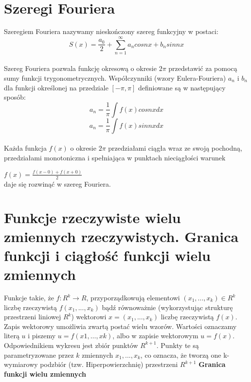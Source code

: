 \documentclass[10pt]{article}
\begin{document}
\section{Szeregi Fouriera}
    Szeregiem Fouriera nazywamy nieskończony szereg funkcyjny w postaci: 
    $$S(x)=\frac{a_0}{2}+\sum_{n=1}^{\infty}a_ncosnx + b_nsinnx$$ \\
    Szereg Fouriera pozwala funkcję okresową o okresie $2\pi$  przedstawić za pomocą sumy funkcji trygonometrycznych. 
    Współczynniki (wzory Eulera-Fouriera) $a_n$ i $b_n$ dla funkcji określonej na przedziale $[-\pi,\pi]$  definiowane są w następujący sposób:
    $$a_n=\frac{1}{\pi}\int f(x)cosnxdx $$
    $$a_n=\frac{1}{\pi}\int f(x)sinnxdx $$ \\
    Każda funkcja $f(x)$ o okresie $2\pi$ przedziałami ciągła wraz ze swoją pochodną, przedziałami monotoniczna i spełniająca w punktach nieciągłości warunek \par
    $f(x)=\frac{f(x-0)+f(x+0)}{2}$\\
    daje się rozwinąć w szereg Fouriera.
\section{Funkcje rzeczywiste wielu zmiennych rzeczywistych. Granica funkcji i ciągłość funkcji wielu zmiennych}
    Funkcje takie, że $f : R^k \rightarrow R$, przyporządkowują elementowi $(x_1, ..., x_k) \in R^k$ liczbę rzeczywistą $f(x_1, ..., x_k)$ bądź równoważnie (wykorzystując strukturę przestrzeni liniowej $R^k$) wektorowi $x = (x_1, ..., x_k)$ liczbę rzeczywistą $f(x)$.\\
    Zapis wektorowy umożliwia zwartą postać wielu wzorów.
    Wartości oznaczamy literą $u$ i piszemy $u = f(x1,…,xk)$, albo  w zapisie wektorowym $u = f(x)$. \\
    Odpowiednikiem wykresu jest zbiór punktów $R^{k+1}$. Punkty te są parametryzowane przez $k$ zmiennych $x_1, ..., x_k$, co oznacza, że tworzą one k-wymiarowy podzbiór (tzw. Hiperpowierzchnię) przestrzeni $R^{k+1}$
    \textbf{Granica funkcji wielu zmiennych}\\
\end{document}
